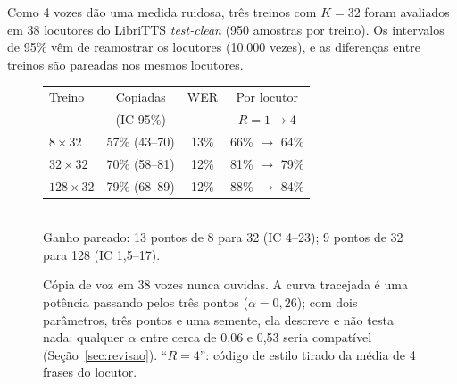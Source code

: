 \documentclass[a4paper,11pt]{article}
\begin{document}
Como 4 vozes dão uma medida ruidosa, três treinos com $K=32$ foram avaliados em 38 locutores do LibriTTS \textit{test-clean} (950 amostras por treino). Os intervalos de 95\% vêm de reamostrar os locutores (10.000 vezes), e as diferenças entre treinos são pareadas nos mesmos locutores.

\begin{figure}[H]
\centering
\begin{minipage}{0.48\textwidth}
\centering
{}
\end{minipage}\hfill
\begin{minipage}{0.48\textwidth}
\small
\begin{tabular}{@{}lccc@{}}
\toprule
Treino & Copiadas & WER & Por locutor\\
 & (IC 95\%) & & $R=1 \rightarrow 4$\\
\midrule
$8\times32$ & 57\% (43--70) & 13\% & 66\% $\rightarrow$ 64\%\\
$32\times32$ & 70\% (58--81) & 12\% & 81\% $\rightarrow$ 79\%\\
$128\times32$ & 79\% (68--89) & 12\% & 88\% $\rightarrow$ 84\%\\
\bottomrule
\end{tabular}\\[6pt]
Ganho pareado: 13 pontos de 8 para 32 (IC 4--23); 9 pontos de 32 para 128 (IC 1,5--17).
\end{minipage}
\caption{Cópia de voz em 38 vozes nunca ouvidas. A curva tracejada é uma potência passando pelos três pontos ($\alpha=0{,}26$); com dois parâmetros, três pontos e uma semente, ela descreve e não testa nada: qualquer $\alpha$ entre cerca de 0,06 e 0,53 seria compatível (Seção~\ref{sec:revisao}). ``$R=4$'': código de estilo tirado da média de 4 frases do locutor.}
\label{fig:larga}
\end{figure}
\end{document}
